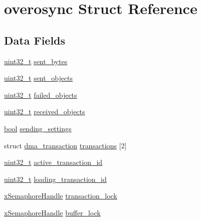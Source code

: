 \hypertarget{structoverosync}{\section{overosync Struct Reference}
\label{structoverosync}
}
\subsection*{Data Fields}
\begin{DoxyCompactItemize}
\item 
\hyperlink{stdint_8h_a435d1572bf3f880d55459d9805097f62}{uint32\-\_\-t} \hyperlink{structoverosync_ae75efe9626e6cd54b7f51937d7ccc8bd}{sent\-\_\-bytes}
\item 
\hyperlink{stdint_8h_a435d1572bf3f880d55459d9805097f62}{uint32\-\_\-t} \hyperlink{structoverosync_ace6edc8026e30f605d99e5f01c6d66a9}{sent\-\_\-objects}
\item 
\hyperlink{stdint_8h_a435d1572bf3f880d55459d9805097f62}{uint32\-\_\-t} \hyperlink{structoverosync_aaa5dfd30a46b95fadb58527bc878b2a9}{failed\-\_\-objects}
\item 
\hyperlink{stdint_8h_a435d1572bf3f880d55459d9805097f62}{uint32\-\_\-t} \hyperlink{structoverosync_a44c38abb842382371674de5e2e1b55fe}{received\-\_\-objects}
\item 
\hyperlink{group___exported__types_gaf6a258d8f3ee5206d682d799316314b1}{bool} \hyperlink{structoverosync_a7a7d310f38281bd01857a3a6e818f16e}{sending\-\_\-settings}
\item 
struct \hyperlink{structdma__transaction}{dma\-\_\-transaction} \hyperlink{structoverosync_afb53dc0407f8d5e956d83e78c3b15782}{transactions} \mbox{[}2\mbox{]}
\item 
\hyperlink{stdint_8h_a435d1572bf3f880d55459d9805097f62}{uint32\-\_\-t} \hyperlink{structoverosync_a1d7c514ddaae4ce9d2eb14242df38685}{active\-\_\-transaction\-\_\-id}
\item 
\hyperlink{stdint_8h_a435d1572bf3f880d55459d9805097f62}{uint32\-\_\-t} \hyperlink{structoverosync_a92326e8268b02ad216b020f15bac9342}{loading\-\_\-transaction\-\_\-id}
\item 
\hyperlink{_common_2_libraries_2_free_r_t_o_s_2_source_2include_2semphr_8h_aa91aa1b6835a184838f9ccf138a6ad10}{x\-Semaphore\-Handle} \hyperlink{structoverosync_acca01c899cb020526ac2809ba6b27fc0}{transaction\-\_\-lock}
\item 
\hyperlink{_common_2_libraries_2_free_r_t_o_s_2_source_2include_2semphr_8h_aa91aa1b6835a184838f9ccf138a6ad10}{x\-Semaphore\-Handle} \hyperlink{structoverosync_aa265838f8057c004fdb2e4ef40685434}{buffer\-\_\-lock}

\end{DoxyCompactItemize}
